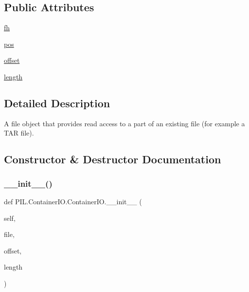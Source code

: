 \subsection*{Public Attributes}
\begin{DoxyCompactItemize}
\item 
\hyperlink{classPIL_1_1ContainerIO_1_1ContainerIO_a5d89a06ea88c8430d3e408190d84d280}{fh}
\item 
\hyperlink{classPIL_1_1ContainerIO_1_1ContainerIO_a38133e5244e83bf3b58483326713392f}{pos}
\item 
\hyperlink{classPIL_1_1ContainerIO_1_1ContainerIO_a50de357582e95edf2e1a90eeabbe33ab}{offset}
\item 
\hyperlink{classPIL_1_1ContainerIO_1_1ContainerIO_ae2306c1c802448c44751f098a8ae55f9}{length}
\end{DoxyCompactItemize}


\subsection{Detailed Description}
\begin{DoxyVerb}A file object that provides read access to a part of an existing
file (for example a TAR file).
\end{DoxyVerb}
 

\subsection{Constructor \& Destructor Documentation}
\mbox{\label{classPIL_1_1ContainerIO_1_1ContainerIO_ac7ffeb406a642696aeb27d9d9f7a4e80}} 
\subsubsection{\texorpdfstring{\+\_\+\+\_\+init\+\_\+\+\_\+()}{\_\_init\_\_()}}
{\footnotesize\ttfamily def P\+I\+L.\+Container\+I\+O.\+Container\+I\+O.\+\_\+\+\_\+init\+\_\+\+\_\+ (\begin{DoxyParamCaption}\item[{}]{self,  }\item[{}]{file,  }\item[{}]{offset,  }\item[{}]{length }\end{DoxyParamCaption})}

